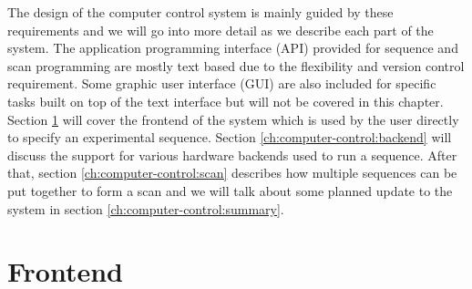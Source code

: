 The design of the computer control system is mainly guided by these requirements
and we will go into more detail as we describe each part of the system.
The application programming interface (API) provided for sequence and scan programming
are mostly text based due to the flexibility and version control requirement.
Some graphic user interface (GUI) are also included for specific tasks
built on top of the text interface but will not be covered in this chapter.
Section \ref{ch:computer-control:frontend} will cover the frontend of the system
which is used by the user directly to specify an experimental sequence.
Section \ref{ch:computer-control:backend} will discuss the support for various
hardware backends used to run a sequence.
After that, section \ref{ch:computer-control:scan} describes how multiple sequences
can be put together to form a scan and
we will talk about some planned update to the system in section
\ref{ch:computer-control:summary}.

\section{Frontend}
\label{ch:computer-control:frontend}

